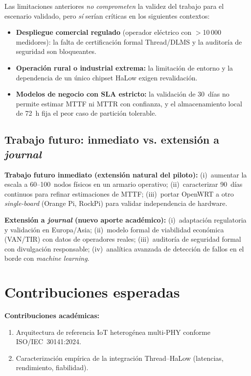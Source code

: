 Las limitaciones anteriores \emph{no comprometen} la validez del trabajo para el escenario validado, pero \emph{sí} serían críticas en los siguientes contextos:

\begin{itemize}
    \item \textbf{Despliegue comercial regulado} (operador eléctrico con $>$10\,000 medidores): la falta de certificación formal Thread/DLMS y la auditoría de seguridad son bloqueantes.
    \item \textbf{Operación rural o industrial extrema:} la limitación de entorno y la dependencia de un único chipset HaLow exigen revalidación.
    \item \textbf{Modelos de negocio con SLA estricto:} la validación de 30~días no permite estimar MTTF ni MTTR con confianza, y el almacenamiento local de 72~h fija el peor caso de partición tolerable.
\end{itemize}

\subsection{Trabajo futuro: inmediato vs. extensión a \emph{journal}}

\textbf{Trabajo futuro inmediato (extensión natural del piloto):} (i)~aumentar la escala a 60--100~nodos físicos en un armario operativo; (ii)~caracterizar 90~días continuos para refinar estimaciones de MTTF; (iii)~portar OpenWRT a otro \emph{single-board} (Orange Pi, RockPi) para validar independencia de hardware.

\textbf{Extensión a \emph{journal} (nuevo aporte académico):} (i)~adaptación regulatoria y validación en Europa/Asia; (ii)~modelo formal de viabilidad económica (VAN/TIR) con datos de operadores reales; (iii)~auditoría de seguridad formal con divulgación responsable; (iv)~analítica avanzada de detección de fallos en el borde con \emph{machine learning}.


\section{Contribuciones esperadas}


\textbf{Contribuciones académicas:}
\begin{enumerate}
    \item Arquitectura de referencia IoT heterogénea multi-PHY conforme ISO/IEC~30141:2024.
    \item Caracterización empírica de la integración Thread--HaLow (latencias, rendimiento, fiabilidad).
\end{enumerate}


